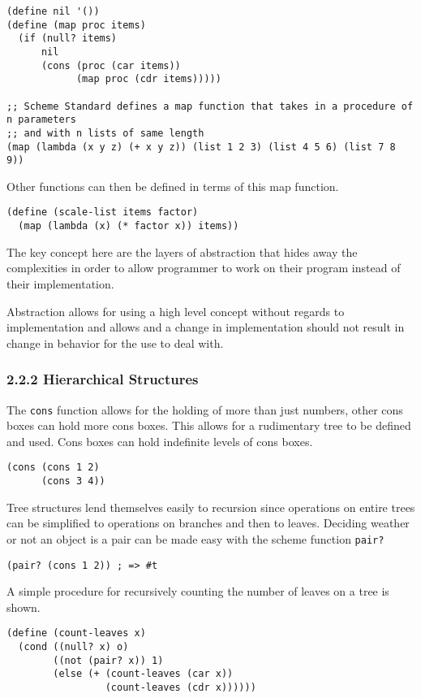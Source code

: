 \documentclass[11pt]{article}
\begin{document}
\begin{verbatim}
(define nil '())
(define (map proc items)
  (if (null? items)
      nil
      (cons (proc (car items))
            (map proc (cdr items)))))

;; Scheme Standard defines a map function that takes in a procedure of n parameters
;; and with n lists of same length
(map (lambda (x y z) (+ x y z)) (list 1 2 3) (list 4 5 6) (list 7 8 9))
\end{verbatim}

Other functions can then be defined in terms of this map function.

\begin{verbatim}
(define (scale-list items factor)
  (map (lambda (x) (* factor x)) items))
\end{verbatim}

The key concept here are the layers of abstraction that hides away the
complexities in order to allow programmer to work on their program
instead of their implementation.

Abstraction allows for using a high level concept without regards to
implementation and allows and a change in implementation should not
result in change in behavior for the use to deal with.

\subsubsection{2.2.2 Hierarchical Structures}
\label{sec:org2d49965}
The \texttt{cons} function allows for the holding of more than just numbers,
other cons boxes can hold more cons boxes. This allows for a rudimentary
tree to be defined and used. Cons boxes can hold indefinite levels of
cons boxes.

\begin{verbatim}
(cons (cons 1 2)
      (cons 3 4))
\end{verbatim}

Tree structures lend themselves easily to recursion since operations on
entire trees can be simplified to operations on branches and then to
leaves. Deciding weather or not an object is a pair can be made easy
with the scheme function \texttt{pair?}

\begin{verbatim}
(pair? (cons 1 2)) ; => #t
\end{verbatim}

A simple procedure for recursively counting the number of leaves on a
tree is shown.

\begin{verbatim}
(define (count-leaves x)
  (cond ((null? x) o)
        ((not (pair? x)) 1)
        (else (+ (count-leaves (car x))
                 (count-leaves (cdr x))))))
\end{verbatim}
\end{document}

